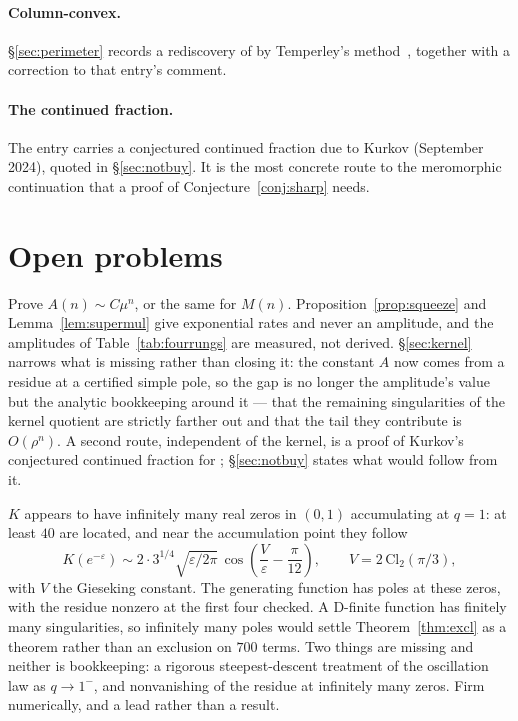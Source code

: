 \documentclass[11pt]{article}
\begin{document}
\paragraph{Column-convex.} \S\ref{sec:perimeter} records a rediscovery of
 by Temperley's method~\cite{temperley1956}, together with a
correction to that entry's comment.

\paragraph{The continued fraction.} The  entry carries a
conjectured continued fraction due to Kurkov (September 2024), quoted in
\S\ref{sec:notbuy}. It is the most concrete route to the meromorphic
continuation that a proof of Conjecture~\ref{conj:sharp} needs.

\section{Open problems}
\label{sec:open}

\begin{openproblem}
Prove $A(n) \sim C\mu^n$, or the same for $M(n)$. Proposition~\ref{prop:squeeze}
and Lemma~\ref{lem:supermul} give exponential rates and never an amplitude, and
the amplitudes of Table~\ref{tab:fourrungs} are measured, not derived.
\S\ref{sec:kernel} narrows what is missing rather than closing it: the constant
$A$ now comes from a residue at a certified simple pole, so the gap is no longer
the amplitude's value but the analytic bookkeeping around it --- that the
remaining singularities of the kernel quotient are strictly farther out and that
the tail they contribute is $O(\rho^n)$. A second route, independent of the
kernel, is a proof of Kurkov's conjectured continued fraction for
; \S\ref{sec:notbuy} states what would follow from it.
\end{openproblem}

\begin{openproblem}
\label{op:kzeros}
$K$ appears to have infinitely many real zeros in $(0,1)$ accumulating at
$q = 1$: at least $40$ are located, and near the accumulation point they follow
\[
  K(e^{-\varepsilon}) \sim 2\cdot 3^{1/4}\sqrt{\varepsilon/2\pi}\,
  \cos\!\left(\frac{V}{\varepsilon} - \frac{\pi}{12}\right),
  \qquad V = 2\,\mathrm{Cl}_2(\pi/3),
\]
with $V$ the Gieseking constant. The generating function has poles at these
zeros, with the residue nonzero at the first four checked. A D-finite function
has finitely many singularities, so infinitely many poles would settle
Theorem~\ref{thm:excl} as a theorem rather than an exclusion on $700$ terms.
Two things are missing and neither is bookkeeping: a rigorous
steepest-descent treatment of the oscillation law as $q \to 1^-$, and
nonvanishing of the residue at infinitely many zeros. Firm numerically, and a
lead rather than a result.
\end{openproblem}
\end{document}
